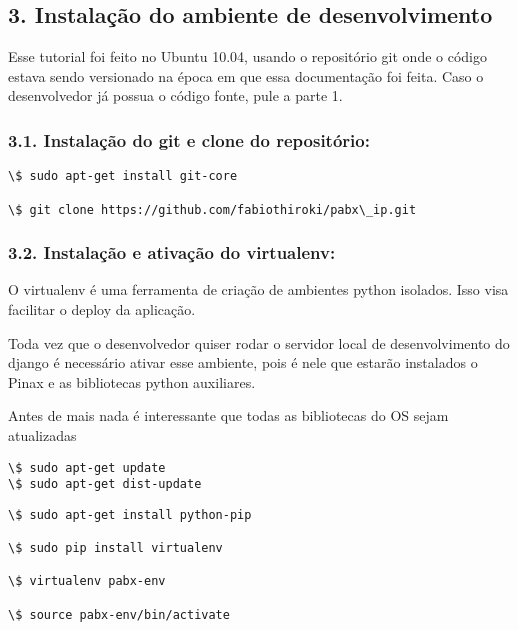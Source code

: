 \documentclass[letterpaper,10pt,brazil]{sphinxmanual}
\begin{document}
\subsection{3. Instalação do ambiente de desenvolvimento}
\label{inicio:instalacao-do-ambiente-de-desenvolvimento}
Esse tutorial foi feito no Ubuntu 10.04, usando o repositório git onde o código estava sendo versionado na época em que essa documentação foi feita. Caso o desenvolvedor já possua o código fonte, pule a parte 1.


\subsubsection{3.1. Instalação do git e clone do repositório:}
\label{inicio:instalacao-do-git-e-clone-do-repositorio}
\begin{Verbatim}[commandchars=\\\{\}]
\$ sudo apt-get install git-core

\$ git clone https://github.com/fabiothiroki/pabx\_ip.git
\end{Verbatim}


\subsubsection{3.2. Instalação e ativação do virtualenv:}
\label{inicio:instalacao-e-ativacao-do-virtualenv}
O virtualenv é uma ferramenta de criação de ambientes python isolados. Isso visa facilitar o deploy da aplicação.

Toda vez que o desenvolvedor quiser rodar o servidor local de desenvolvimento do django é necessário ativar esse ambiente, pois é nele que estarão instalados o Pinax e as bibliotecas python auxiliares.

Antes de mais nada é interessante que todas as bibliotecas do OS sejam atualizadas

\begin{Verbatim}[commandchars=\\\{\}]
\$ sudo apt-get update
\$ sudo apt-get dist-update
\end{Verbatim}

\begin{Verbatim}[commandchars=\\\{\}]
\$ sudo apt-get install python-pip

\$ sudo pip install virtualenv

\$ virtualenv pabx-env

\$ source pabx-env/bin/activate
\end{Verbatim}
\end{document}
